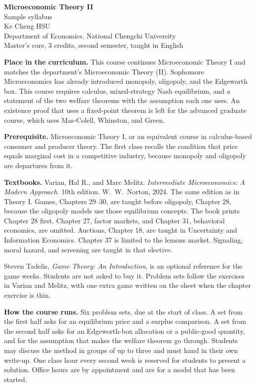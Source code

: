 \documentclass[11pt]{article}
\begin{document}
\begin{center}
{\Large\bfseries Microeconomic Theory II}\\[0.3em]
Sample syllabus\\[0.15em]
Ke Cheng HSU\\
Department of Economics, National Chengchi University\\
Master's core, 3 credits, second semester, taught in English
\end{center}

\textbf{Place in the curriculum.}
This course continues Microeconomic Theory I and matches the department's Microeconomic Theory (II). Sophomore Microeconomics has already introduced monopoly, oligopoly, and the Edgeworth box. This course requires calculus, mixed-strategy Nash equilibrium, and a statement of the two welfare theorems with the assumption each one uses. An existence proof that uses a fixed-point theorem is left for the advanced graduate course, which uses Mas-Colell, Whinston, and Green.

\textbf{Prerequisite.}
Microeconomic Theory I, or an equivalent course in calculus-based consumer and producer theory. The first class recalls the condition that price equals marginal cost in a competitive industry, because monopoly and oligopoly are departures from it.

\textbf{Textbooks.}
Varian, Hal R., and Marc Melitz. \emph{Intermediate Microeconomics: A Modern Approach}. 10th edition. W.\ W.\ Norton, 2024. The same edition as in Theory I. Games, Chapters 29--30, are taught before oligopoly, Chapter 28, because the oligopoly models use those equilibrium concepts. The book prints Chapter 28 first. Chapter 27, factor markets, and Chapter 31, behavioral economics, are omitted. Auctions, Chapter 18, are taught in Uncertainty and Information Economics. Chapter 37 is limited to the lemons market. Signaling, moral hazard, and screening are taught in that elective.

Steven Tadelis, \emph{Game Theory: An Introduction}, is an optional reference for the game weeks. Students are not asked to buy it. Problem sets follow the exercises in Varian and Melitz, with one extra game written on the sheet when the chapter exercise is thin.

\textbf{How the course runs.}
Six problem sets, due at the start of class. A set from the first half asks for an equilibrium price and a surplus comparison. A set from the second half asks for an Edgeworth-box allocation or a public-good quantity, and for the assumption that makes the welfare theorem go through. Students may discuss the method in groups of up to three and must hand in their own write-up. One class hour every second week is reserved for students to present a solution. Office hours are by appointment and are for a model that has been started.
\end{document}
